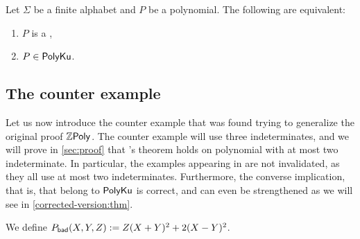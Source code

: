 \begin{faketheorem} 
    \label{karh:thm}
    Let $\Sigma$ be a finite alphabet
    and $P$ be a polynomial. The following are equivalent:
    \begin{enumerate}
        \item $P$ is a ,
        \item $P \in \mathsf{PolyKu}$.
    \end{enumerate}
\end{faketheorem}


\subsection{The counter example}
\label{sec:c-example}

Let us now introduce the counter example that was found trying to generalize
the original proof $\ZPoly$.
The counter example will use three indeterminates, and
we will prove in \cref{sec:proof} that \citeauthor{KARH77}’s theorem holds on
polynomial with at most two indeterminate. In particular, the examples
appearing in \cite{KARH77} are not invalidated, as they all use at most two
indeterminates. Furthermore, the converse implication, that is, that
 belong to $\mathsf{PolyKu}$ is correct, and can
even be strengthened as we will see in \cref{corrected-version:thm}.

\begin{definition}
    \label{def:bad-polynomial}
    We define $P_{\mathsf{bad}}(X,Y,Z) \mathrel{:=} Z (X + Y)^2 + 2 (X - Y)^2$.
\end{definition}

